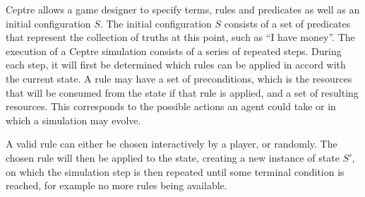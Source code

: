 Ceptre allows a game designer to specify terms, rules and predicates as well as an initial configuration $S$.
The initial configuration $S$ consists of a set of predicates that represent the collection of truths at this point, such as \enquote{I have money}.
The execution of a Ceptre simulation consists of a series of repeated steps.
During each step, it will first be determined which rules can be applied in accord with the current state.
A rule may have a set of preconditions, which is the resources that will be consumed from the state if that rule is applied, and a set of resulting resources.
This corresponds to the possible actions an agent could take or in which a simulation may evolve.

A valid rule can either be chosen interactively by a player, or randomly.
The chosen rule will then be applied to the state, creating a new instance of state $S'$, on which the simulation step is then repeated until some terminal condition is reached, for example no more rules being available.

